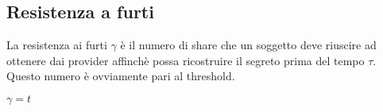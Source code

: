 \subsection{Resistenza a furti}
\label{subsec:resistenza-a-furti}
La resistenza ai furti $ \gamma $ è il numero di share che un soggetto deve riuscire
ad ottenere dai provider affinchè possa
ricostruire il segreto prima del tempo $ \tau $.
Questo numero è ovviamente pari al threshold.
\begin{center}
	$ \gamma = t $
\end{center}








